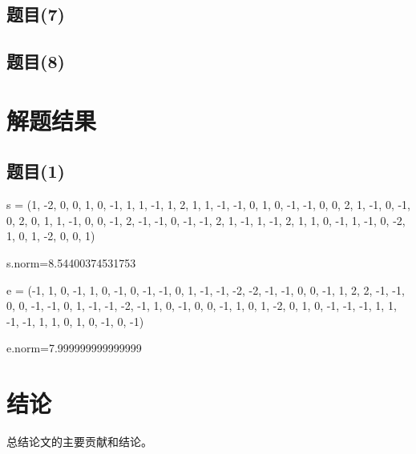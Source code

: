 \documentclass[12pt,a4paper]{article}
\numberwithin{equation}{section}
\begin{document}
\subsection{题目(7)}

\subsection{题目(8)}

\section{解题结果}

\subsection{题目(1)}


s = (1, -2, 0, 0, 1, 0, -1, 1, 1, -1, 1, 2, 1, 1,
-1, -1, 0, 1, 0, -1, -1, 0, 0, 2, 1, -1, 0, -1, 0, 2, 0, 1,
1, -1, 0, 0, -1, 2, -1, -1, 0, -1, -1, 2, 1, -1, 1, -1, 2, 1, 1, 0,
-1, 1, -1, 0, -2, 1, 0, 1, -2, 0, 0, 1)

s.norm=8.54400374531753

\hspace*{\fill}

e = (-1, 1, 0, -1, 1, 0, -1, 0, -1, -1, 0, 1, -1, -1, -2, -2, -1, -1, 0, 0, -1, 1, 2, 2, -1,
-1, 0, 0, -1, -1, 0, 1, -1, -1, -2, -1, 1, 0, -1, 0, 0, -1, 1, 0, 1, -2, 0, 1, 0, -1, -1,
-1, 1, 1, -1, -1, 1, 1, 0, 1, 0, -1, 0, -1)

e.norm=7.999999999999999

\section{结论}

总结论文的主要贡献和结论。
\end{document}
